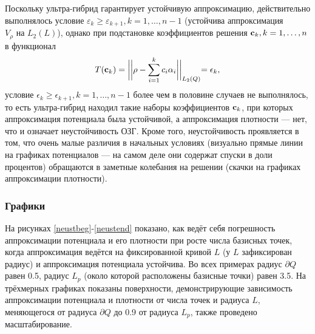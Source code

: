 \documentclass[a4paper]{article}
\begin{document}
Поскольку ультра-гибрид гарантирует устойчивую аппроксимацию, действительно выполнялось условие $\varepsilon_k \geq \varepsilon_{k+1}, k=1, \dots, n-1$ (устойчива аппроксимация $V_{\rho} \text{ на } L_2(L)$), однако при подстановке коэффициентов решения ${\bf c}_k, k=1,\dots,n$ в функционал
\begin{equation*}
  T({\bf c}_k)=\biggl|\biggl|\rho - \sum_{i=1}^k c_i \alpha_i\biggl|\biggl|_{L_2(Q)}=\epsilon_k,
\end{equation*}
условие $\epsilon_k \geq \epsilon_{k+1}, k=1, \dots, n-1$ более чем в половине случаев не выполнялось, то есть ультра-гибрид находил такие наборы коэффициентов ${\bf c}_k$, при которых
аппроксимация потенциала была устойчивой, а аппроксимация плотности --- нет, что и означает неустойчивость ОЗГ.
Кроме того, неустойчивость проявляется в том, что очень малые различия в начальных условиях (визуально прямые линии на графиках потенциалов --- на самом деле они содержат спуски в доли процентов) обращаются в заметные колебания на решении (скачки на графиках аппроксимации плотности). 

\subsubsection{Графики}
На рисунках \ref{neustbeg}-\ref{neustend} показано, как ведёт себя погрешность аппроксимации потенциала и его плотности при росте числа базисных точек, когда аппроксимация ведётся на фиксированной кривой $L$ (у $L$ зафиксирован радиус) и аппроксимация потенциала устойчива.
Во всех примерах радиус $\partial Q$ равен 0.5, радиус $L_p$ (около которой расположены базисные точки) равен 3.5. На трёхмерных графиках показаны поверхности, демонстрирующие зависимость аппроксимации потенциала и плотности от числа точек и радиуса $L$, меняющегося от радиуса $\partial Q$ до 0.9 от радиуса $L_p$, также проведено масштабирование.
\end{document}
